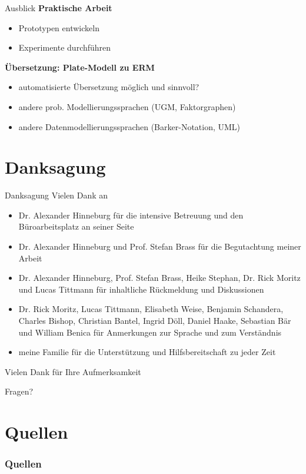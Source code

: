 \documentclass{beamer}
\begin{document}
\begin{frame}{Ausblick}
\textbf{Praktische Arbeit}
\begin{itemize}
\item Prototypen entwickeln
\item Experimente durchführen
\end{itemize}\pause

\vspace*{2em}
\textbf{Übersetzung: Plate-Modell zu ERM}
\begin{itemize}
\item automatisierte Übersetzung möglich und sinnvoll?
\item andere prob. Modellierungssprachen (UGM, Faktorgraphen)
\item andere Datenmodellierungssprachen (Barker-Notation, UML)
\end{itemize}
\end{frame}

\section*{Danksagung}

\begin{frame}{Danksagung}
Vielen Dank an
\begin{itemize}
\item Dr. Alexander Hinneburg für die intensive Betreuung und den Büroarbeitsplatz an seiner Seite
\item Dr. Alexander Hinneburg und Prof. Stefan Brass für die Begutachtung meiner Arbeit
\item Dr. Alexander Hinneburg, Prof. Stefan Brass, Heike Stephan, Dr. Rick Moritz und Lucas Tittmann für inhaltliche Rückmeldung und Diskussionen
\item Dr. Rick Moritz, Lucas Tittmann, Elisabeth Weise, Benjamin Schandera, Charles Bishop, Christian Bantel, Ingrid Döll, Daniel Haake, Sebastian Bär und William Benica für Anmerkungen zur Sprache und zum Verständnis
\item meine Familie für die Unterstützung und Hilfsbereitschaft zu jeder Zeit
\end{itemize}
\end{frame}

\begin{frame}
\thispagestyle{empty}
\begin{center}
\Huge Vielen Dank für Ihre Aufmerksamkeit

\vspace*{2em}
Fragen?
\end{center}
\end{frame}

\section*{Quellen}
\begin{frame}
\frametitle{Quellen}
\def\bibfont{\scriptsize}
\printbibliography
\end{frame}
\end{document}
